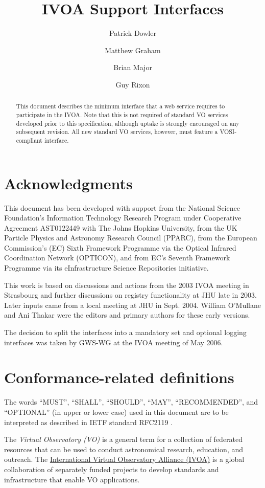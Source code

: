 \documentclass[11pt,letter]{ivoa}
\title{IVOA Support Interfaces}
\author{Patrick Dowler}
\author{Matthew Graham}
\author{Brian Major}
\author{Guy Rixon}
\begin{document}
\begin{abstract}
This document describes the minimum interface that a web service
requires to participate in the IVOA. Note that this is not required of
standard VO services developed prior to this specification, although
uptake is strongly encouraged on any subsequent revision. All new
standard VO services, however, must feature a VOSI-compliant interface. 
\end{abstract}


\section*{Acknowledgments}

This document has been developed with support from the National Science
Foundation's Information Technology Research Program under Cooperative
Agreement AST0122449 with The Johns Hopkins University, from the UK
Particle Physics and Astronomy Research Council (PPARC), from the
European Commission's (EC) Sixth Framework Programme via the Optical
Infrared Coordination Network (OPTICON), and from EC's Seventh Framework
Programme via its eInfrastructure Science Repositories initiative.

This work is based on discussions and actions from the 2003 IVOA meeting
in Strasbourg and further discussions on registry functionality at JHU
late in 2003. Later inputs came from a local meeting at JHU in Sept.
2004. William O'Mullane and Ani Thakar were the editors and primary
authors for these early versions.

The decision to split the interfaces into a mandatory set and optional
logging interfaces was taken by GWS-WG at the IVOA meeting of May 2006. 

\section*{Conformance-related definitions}

The words ``MUST'', ``SHALL'', ``SHOULD'', ``MAY'', ``RECOMMENDED'', and
``OPTIONAL'' (in upper or lower case) used in this document are to be
interpreted as described in IETF standard RFC2119 \citep{std:RFC2119}.

The \emph{Virtual Observatory (VO)} is a
general term for a collection of federated resources that can be used
to conduct astronomical research, education, and outreach.
The \href{http://www.ivoa.net}{International
Virtual Observatory Alliance (IVOA)} is a global
collaboration of separately funded projects to develop standards and
infrastructure that enable VO applications.
\end{document}
